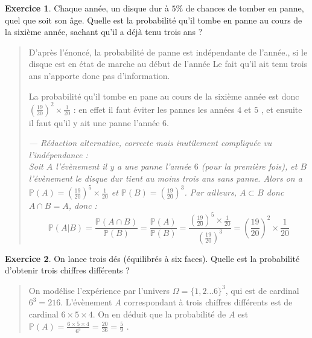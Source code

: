 \documentclass[11pt]{article}
\renewcommand{\P}{\mathbb P}
\theoremstyle{definition}
\newtheorem{exo}{Exercice}
\newenvironment{solution}{\begin{quote}\color{teal}}{\end{quote}}
\begin{document}

\begin{exo}
Chaque année, un disque dur à $5\%$ de chances de tomber en panne, quel que soit son âge. Quelle est la probabilité qu'il  tombe en panne au cours de la sixième année, sachant qu'il a déjà tenu trois ans ?
\begin{solution}
D'après l'énoncé, la probabilité de panne est indépendante de l'année., si le disque est en état de marche au début de l'année  Le fait qu'il ait tenu trois ans n'apporte donc pas d'information.

La probabilité qu'il tombe en pane au cours de la sixième année est donc $\left(\frac{19}{20}\right)^2\times \frac{1}{20}$ : en effet il faut éviter les pannes les années $4$ et $5$ , et ensuite il faut qu'il y ait une panne l'année $6$.

\emph{--- Rédaction alternative,  correcte mais inutilement compliquée vu l'indépendance :\\
Soit $A$ l'évènement \og il y a une panne l'année $6$ (pour la première fois)\fg, et $B$ l'évènement \og le disque dur tient au moins trois ans sans panne\fg. Alors on a $\P(A)=\left(\frac{19}{20}\right)^5\times \frac{1}{20}$ et $\P(B)=\left(\frac{19}{20}\right)^3$.  Par ailleurs, $A\subset B$ donc $A\cap B = A$, donc :
\[ \P(A\vert B) = \frac{\P(A\cap B)}{\P(B)}=\frac{\P(A)}{\P(B)}
=\frac{\left(\frac{19}{20}\right)^5\times \frac{1}{20}}{\left(\frac{19}{20}\right)^3}
=\left(\frac{19}{20}\right)^2\times \frac{1}{20}\]}
\end{solution}
\end{exo}

\begin{exo}
On lance trois dés (équilibrés à six faces). 
Quelle est la probabilité d'obtenir trois chiffres différents ?
\begin{solution}
On modélise l'expérience par l'univers $\Omega=\{1,2\dots 6\}^3$, qui est de cardinal $6^3=216$.
L'évènement $A$ correspondant à trois chiffres différents est de cardinal $6\times 5\times 4$. 
On en déduit que la probabilité de $A$ est $\P(A)=\frac{6\times 5\times 4}{6^3}=\frac{20}{36}=\boxed{\frac{5}{9}}$ .
\end{solution}
\end{exo}
\end{document}
